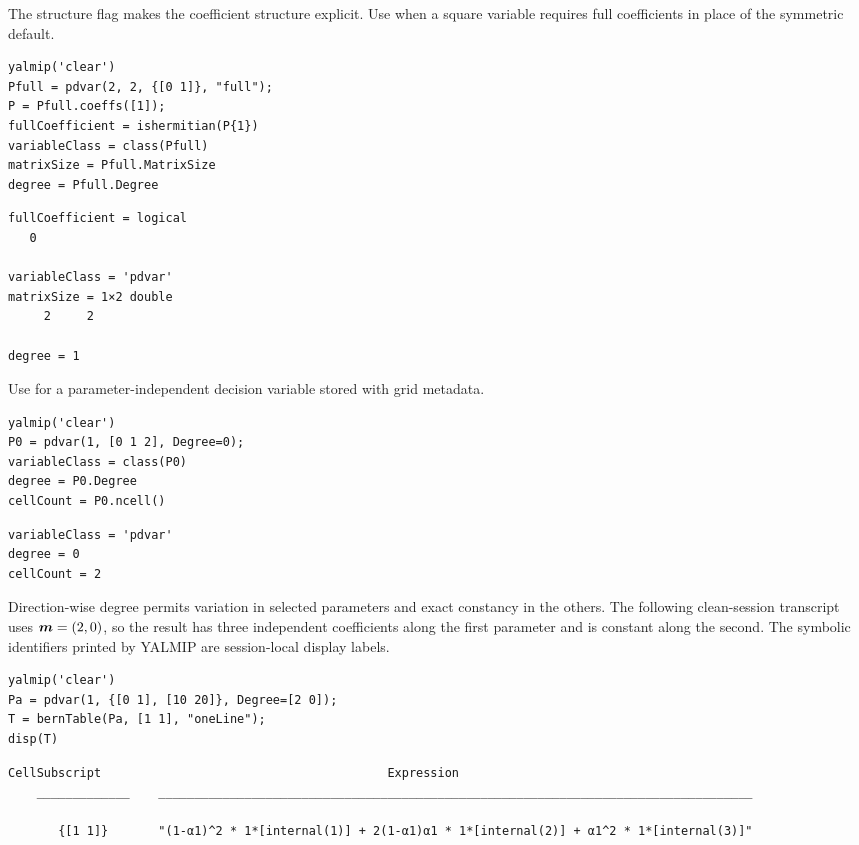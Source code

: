 The structure flag makes the coefficient structure explicit. Use  when a square variable requires full coefficients in place of the symmetric default.

\begin{lstlisting}[style=dpmatlab]
yalmip('clear')
Pfull = pdvar(2, 2, {[0 1]}, "full");
P = Pfull.coeffs([1]);
fullCoefficient = ishermitian(P{1})
variableClass = class(Pfull)
matrixSize = Pfull.MatrixSize
degree = Pfull.Degree
\end{lstlisting}

\begin{lstlisting}[style=dpoutput]
fullCoefficient = logical
   0

variableClass = 'pdvar'
matrixSize = 1×2 double
     2     2

degree = 1
\end{lstlisting}

\shortpairspace
Use  for a parameter-independent decision variable stored with grid metadata.


\begin{lstlisting}[style=dpmatlab]
yalmip('clear')
P0 = pdvar(1, [0 1 2], Degree=0);
variableClass = class(P0)
degree = P0.Degree
cellCount = P0.ncell()
\end{lstlisting}

\begin{lstlisting}[style=dpoutput]
variableClass = 'pdvar'
degree = 0
cellCount = 2
\end{lstlisting}

\shortpairspace
Direction-wise degree permits variation in selected parameters and exact constancy in the others. The following clean-session transcript uses $\boldsymbol{m}=(2,0)$, so the result has three independent coefficients along the first parameter and is constant along the second. The symbolic identifiers printed by YALMIP are session-local display labels.

\begin{lstlisting}[style=dpmatlab]
yalmip('clear')
Pa = pdvar(1, {[0 1], [10 20]}, Degree=[2 0]);
T = bernTable(Pa, [1 1], "oneLine");
disp(T)
\end{lstlisting}

\begin{lstlisting}[style=dpwideoutput]
    CellSubscript                                        Expression
    _____________    ___________________________________________________________________________________

       {[1 1]}       "(1-α1)^2 * 1*[internal(1)] + 2(1-α1)α1 * 1*[internal(2)] + α1^2 * 1*[internal(3)]"
\end{lstlisting}

